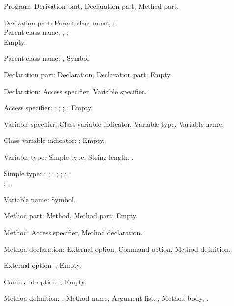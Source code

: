 \documentclass{article}
\begin{document}
\begin{raggedright}
\begin{center}
\end{center}
Program: Derivation part, Declaration part, Method part.

\begin{center}
\end{center}
Derivation part: Parent class name, ;\\
\tc              Parent class name, , ;\\
\tc              Empty.

Parent class name: \sy{:}, Symbol.

\begin{center}
\end{center}
Declaration part: Declaration, Declaration part; Empty.

Declaration: Access specifier, Variable specifier.

Access specifier:   ; ;
                    ; ;
                    Empty.

Variable specifier: Class variable indicator, Variable type, Variable
                    name.

Class variable indicator: ; Empty.

Variable type:  Simple type; String length, .

Simple type:    ; ; ;
                ; ;
                ; ;\\
\tc             {}; .

Variable name:  Symbol.

\begin{center}
\end{center}
Method part: Method, Method part; Empty.

Method: Access specifier, Method declaration.

Method declaration: External option, Command option, Method
definition.

External option: ; Empty.

Command option: ; Empty.

Method definition: , Method name, Argument list, \sy{\{},
    Method body, \sy{\}}.


\end{raggedright}
\end{document}
